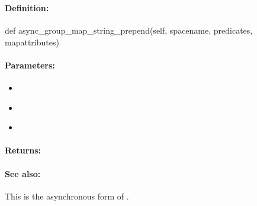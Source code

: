 \pagebreak
\subsubsection{}
\label{api:python:async_group_map_string_prepend}


\paragraph{Definition:}
\begin{pythoncode}
def async_group_map_string_prepend(self, spacename, predicates, mapattributes)
\end{pythoncode}

\paragraph{Parameters:}
\begin{itemize}[noitemsep]
\item {}\\

\item {}\\

\item {}\\

\end{itemize}

\paragraph{Returns:}


\paragraph{See also:}  This is the asynchronous form of .

\pagebreak
\subsubsection{}
\label{api:python:map_string_append}


